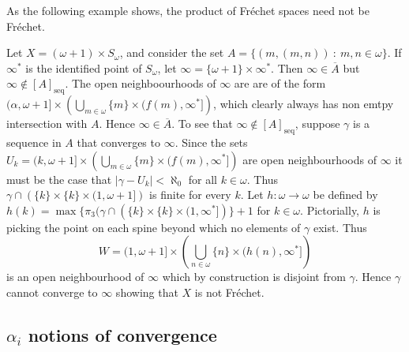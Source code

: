 \documentclass{article}
\newcommand{\seqcl}[1]{{[#1]_{\text{seq}}}}
\begin{document}
As the following example shows, the product of Fréchet spaces need not be Fréchet.
\begin{exam}
    \label{ex: Frechet Product 1}
    Let \(X = (\omega + 1) \times S_\omega\), and consider the set \(A = \{(m, (m, n))\: : \:  m, n \in \omega\}\). If \(\infty^{\ast}\) is the identified point of \(S_{\omega}\), let \(\infty = \{\omega + 1\} \times \infty^{\ast}\). Then \(\infty \in \overline{A}\) but \(\infty \not \in \seqcl{A}\). The open neighboourhoods of \(\infty\) are are of the form \((\alpha, \omega + 1] \times\left(\bigcup_{m \in \omega}\{m\} \times (f(m), \infty^{\ast}]\right)\), which clearly always has non emtpy intersection with \(A\). Hence \(\infty \in \overline{A}\). To see that \(\infty \not \in \seqcl{A}\), suppose \(\gamma\) is a sequence in \(A\) that converges to \(\infty\). Since the sets \(U_k = (k, \omega + 1] \times\left(\bigcup_{m \in \omega}\{m\} \times (f(m), \infty^{\ast}]\right)\) are open neighbourhoods of \(\infty\) it must be the case that \(|\gamma - U_k | < \aleph_0\) for all \(k \in \omega\). Thus  \(\gamma\cap\left(\{k\}\times\{k\}\times(1,\omega + 1]\right)\) is finite for every \(k\). Let \(h:\omega \to \omega\) be defined by \(h(k) = \max\{\pi_3(\gamma\cap\left(\{k\}\times\{k\}\times(1,\infty^{\ast}]\right)\} + 1\) for \(k \in \omega\). Pictorially, \(h\) is picking the point on each spine beyond which no elements of \(\gamma\) exist. Thus 
    \[
    W = (1, \omega + 1] \times\left(\bigcup_{n \in \omega}\{n\}\times(h(n), \infty^{\ast}]\right)
    \] 
    is an open neighbourhood of \(\infty\) which by construction is disjoint from \(\gamma\). Hence \(\gamma\) cannot converge to \(\infty\) showing that \(X\) is not Fréchet.
\end{exam}

\subsection{\(\alpha_i\) notions of convergence}
\end{document}
